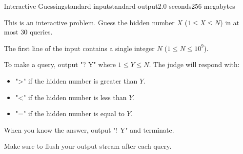 \begin{problem}{Interactive Guessing}{standard input}{standard output}{2.0 seconds}{256 megabytes}

This is an interactive problem.
Guess the hidden number $X$ ($1 \le X \le N$) in at most 30 queries.

The first line of the input contains a single integer $N$ ($1 \le N \le 10^9$).

\outputfile
To make a query, output "? Y" where $1 \le Y \le N$. The judge will respond with:
\begin{itemize}
    \item ">" if the hidden number is greater than $Y$.
    \item "<" if the hidden number is less than $Y$.
    \item "=" if the hidden number is equal to $Y$.
\end{itemize}

When you know the answer, output "! Y" and terminate.

\Examples

\begin{example}
%
\end{example}

\note
Make sure to flush your output stream after each query.

\end{problem}